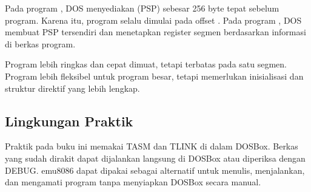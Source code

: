 Pada program , DOS menyediakan  (PSP) sebesar 256 byte tepat sebelum program. Karena itu,
program  selalu dimulai pada offset . Pada
program , DOS membuat PSP tersendiri dan menetapkan
register segmen berdasarkan informasi di berkas program.

\begin{infobox}
\vspace{1.1em}
Program  lebih ringkas dan cepat dimuat, tetapi terbatas
pada satu segmen. Program  lebih fleksibel untuk program
besar, tetapi memerlukan inisialisasi  dan struktur direktif
yang lebih lengkap.
\end{infobox}

\subsection{Lingkungan Praktik}

Praktik pada buku ini memakai TASM dan TLINK di dalam DOSBox. Berkas
yang sudah dirakit dapat dijalankan langsung di DOSBox atau diperiksa
dengan DEBUG. emu8086 dapat dipakai sebagai alternatif untuk menulis,
 menjalankan, dan mengamati program tanpa menyiapkan DOSBox secara
manual.
